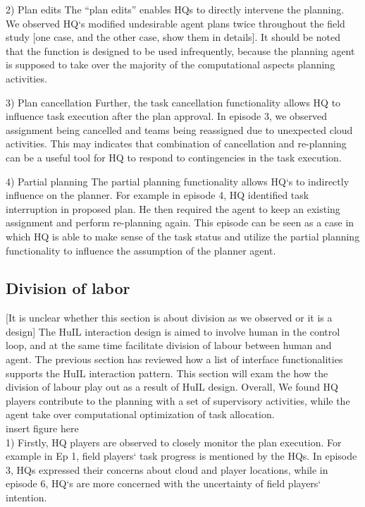 2) Plan edits 
The ``plan edits'' enables HQs to directly intervene the planning. We observed HQ`s modified undesirable agent plans twice throughout the field study [one case, and the other case, show them in details]. It should be noted that the function is designed to be used infrequently, because the planning agent is supposed to take over the majority of the computational aspects 
planning activities. 

3) Plan cancellation 
Further, the task cancellation functionality allows HQ to influence task execution after the plan approval. In episode 3, we observed assignment being cancelled and teams being reassigned due to unexpected cloud activities. This may indicates that combination of cancellation and re-planning can be a useful tool for HQ to respond to contingencies in the task execution.

4) Partial planning
The partial planning functionality allows HQ`s to indirectly influence on the planner. For example in episode 4, HQ identified task interruption in proposed plan. He then required the agent to keep an existing assignment and perform re-planning again.  This episode can be seen as a case in which HQ is able to make sense of the task status and utilize the partial planning functionality to influence the assumption of the planner agent. 


\subsection{ Division of labor }
[It is unclear whether this section is about division as we observed or it is a design]
The HuIL interaction design is aimed to involve human in the control loop, and at the same time facilitate division of labour between human and agent. The previous section has reviewed how a list of interface functionalities supports the HuIL interaction pattern. This section will exam the how the division of labour play out as a result of HuIL design. Overall, We found HQ players contribute to the planning with a set of supervisory activities, while the agent take over computational optimization of task allocation. \\

insert figure here\\


1) Firstly, HQ players are observed to closely monitor the plan execution. For example in Ep 1, field players` task progress is mentioned by the HQs. In episode 3, HQs expressed their concerns about cloud and player locations, while in episode 6, HQ`s are more concerned with the uncertainty of field players` intention. 

